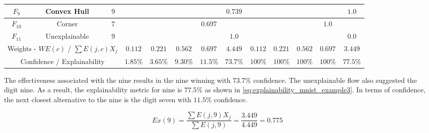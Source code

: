 \begin{table}[H]
\begin{center}
{\begin{tabular}{| c | c | c | c | c | c | c | c || c | c | c | c | c |}
        \hline
        $F_9$& Convex Hull & $9$ &  &  &  &  & $0.739$ &  &  &  &  & $1.0$ \\
        \hline
        $F_{10}$& Corner & $7$ &  &  &  & $0.697$ &  &  &  &  & $1.0$ &  \\
        \hline
        $F_{11}$& Unexplainable & $9$ &  &  &  &  & $1.0$ & & & & & $0.0$ \\
        \hline
        \hline
        \multicolumn{3}{|c|}{Weights - $WE(c)$ / $\sum E(j,c)X_j$} & $0.112$ & $0.221$ & $0.562$ & $0.697$ & $4.449$ & $0.112$ & $0.221$ & $0.562$ & $0.697$ & $3.449$ \\
        \cline{0-12}
        \multicolumn{3}{|c|}{Confidence / Explainability} & $1.85\%$ & $3.65\%$ & $9.30\%$ & $11.5\%$ & $73.7\%$ & $100\%$ & $100\%$ & $100\%$ & $100\%$ & $77.5\%$ \\
        \cline{0-12}
        \end{tabular}
        }
        \end{center}
\end{table}

The effectiveness associated with the nine results in the nine winning with
$73.7\%$ confidence.  The unexplainable flow also suggested the digit nine. As a
result, the explainability metric for nine is $77.5\%$ as shown in
\eqref{eq:explainability_mnist_example3}.  In terms of confidence, the next
closest alternative to the nine is the digit seven with $11.5\%$ confidence.

\begin{equation}\label{eq:explainability_mnist_example3}
    Ex(9)=\frac{\sum{E(j,9)X_j}}{\sum{E(j,9)}} = \frac{3.449}{4.449}=0.775
\end{equation}


